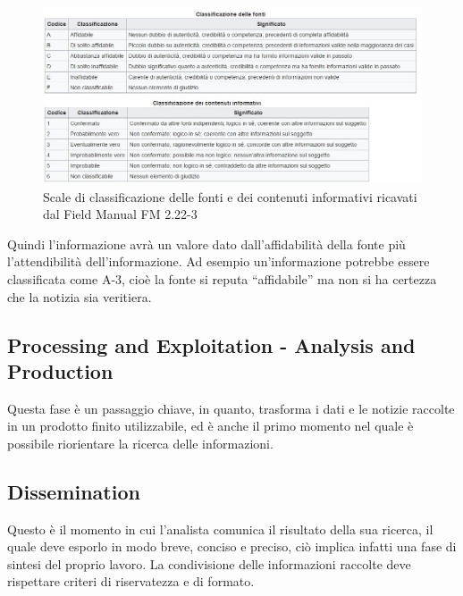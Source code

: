 \begin{figure}[h]
\begin{center}
\includegraphics[width=0.95\columnwidth]{images/3_CTI_img/classificazioneInformazione.jpg}
\end{center}
\caption{Scale di classificazione delle fonti e dei contenuti informativi ricavati dal Field Manual FM 2.22-3}
\label{fig:Scale di classificazione delle fonti e dei contenuti informativi ricavati dal Field Manual FM 2.22-3}
\end{figure}

Quindi l’informazione avrà un valore dato dall’affidabilità della fonte più l’attendibilità dell’informazione. 
Ad esempio un’informazione potrebbe essere classificata come A-3, cioè la fonte si reputa “affidabile” ma non si ha certezza che la notizia sia veritiera.



\subsection{Processing and Exploitation - Analysis and Production}

Questa fase è un passaggio chiave, in quanto, trasforma i dati e le notizie raccolte in un prodotto finito utilizzabile, ed è anche il primo momento nel quale è possibile riorientare la ricerca delle informazioni.

\subsection{Dissemination}


Questo è il momento in cui l’analista comunica il risultato della sua ricerca, il quale deve esporlo in modo breve, conciso e preciso, ciò implica infatti una fase di sintesi del proprio lavoro.
La condivisione delle informazioni raccolte deve rispettare criteri di riservatezza e di formato.

\newpage


